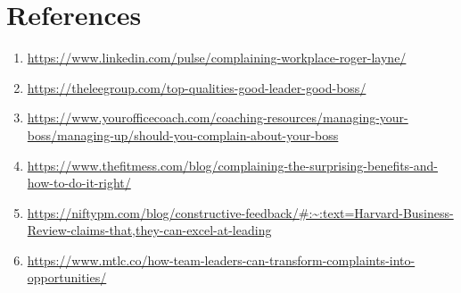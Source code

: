 \documentclass[a4paper,12pt]{report}
\begin{document}
\chapter{References}
\begin{enumerate}
  \item \url{https://www.linkedin.com/pulse/complaining-workplace-roger-layne/}
   \item \url{https://theleegroup.com/top-qualities-good-leader-good-boss/}
     \item \url{https://www.yourofficecoach.com/coaching-resources/managing-your-boss/managing-up/should-you-complain-about-your-boss}
     \item \url{https://www.thefitmess.com/blog/complaining-the-surprising-benefits-and-how-to-do-it-right/}
     \item \url{https://niftypm.com/blog/constructive-feedback/#:~:text=Harvard-Business-Review-claims-that,they-can-excel-at-leading}
     \item \url{https://www.mtlc.co/how-team-leaders-can-transform-complaints-into-opportunities/}
\end{enumerate}
\end{document}
